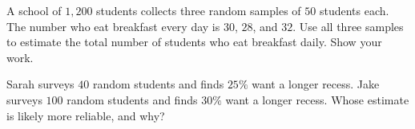 \begin{challengeBox}
\prob A school of $1{,}200$ students collects three random samples of $50$ students each. The number who eat breakfast every day is $30$, $28$, and $32$. Use all three samples to estimate the total number of students who eat breakfast daily. Show your work. \answerBlank[3cm]

\prob Sarah surveys $40$ random students and finds $25\%$ want a longer recess. Jake surveys $100$ random students and finds $30\%$ want a longer recess. Whose estimate is likely more reliable, and why?
\end{challengeBox}

